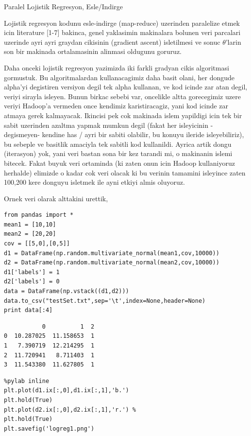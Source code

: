 \documentclass[12pt,fleqn]{article}\usepackage{../common}
\begin{document}
Paralel Lojistik Regresyon, Esle/Indirge

Lojistik regresyon kodunu esle-indirge (map-reduce) uzerinden paralelize
etmek icin literature [1-7] bakinca, genel yaklasimin makinalara bolunen
veri parcalari uzerinde ayri ayri graydan cikisinin (gradient ascent)
isletilmesi ve sonuc $\theta$'larin son bir makinada ortalamasinin alinmasi
oldugunu goruruz.

Daha onceki lojistik regresyon yazimizda iki farkli gradyan cikis
algoritmasi gormustuk. Bu algoritmalardan kullanacagimiz daha basit olani,
her dongude alpha'yi degistiren versiyon degil tek alpha kullanan, ve kod
icinde zar atan degil, veriyi sirayla isleyen. Bunun birkac sebebi var,
oncelikle altta gorecegimiz uzere veriyi Hadoop'a vermeden once kendimiz
karistiracagiz, yani kod icinde zar atmaya gerek kalmayacak. Ikincisi pek
cok makinada islem yapildigi icin tek bir sabit uzerinden azaltma yapmak
mumkun degil (fakat her isleyicinin -degismeyen- kendine has / ayri bir
sabiti olabilir, bu konuyu ileride isleyebiliriz), bu sebeple ve basitlik
amaciyla tek sabitli kod kullanildi. Ayrica artik dongu (iterasyon) yok,
yani veri bastan sona bir kez tarandi mi, o makinanin islemi bitecek. Fakat
buyuk veri ortaminda (ki zaten onun icin Hadoop kullaniyoruz herhalde)
elimizde o kadar cok veri olacak ki bu verinin tamamini isleyince zaten
100,200 kere donguyu isletmek ile ayni etkiyi almis oluyoruz.

Ornek veri olarak alttakini urettik,

\begin{verbatim}
from pandas import *
mean1 = [10,10]
mean2 = [20,20]
cov = [[5,0],[0,5]]             
d1 = DataFrame(np.random.multivariate_normal(mean1,cov,10000))
d2 = DataFrame(np.random.multivariate_normal(mean2,cov,10000))
d1['labels'] = 1
d2['labels'] = 0
data = DataFrame(np.vstack((d1,d2)))
data.to_csv("testSet.txt",sep='\t',index=None,header=None)
print data[:4]
\end{verbatim}

\begin{verbatim}
           0          1  2
0  10.287025  11.158653  1
1   7.390719  12.214295  1
2  11.720941   8.711403  1
3  11.543380  11.627805  1
\end{verbatim}

\begin{verbatim}
%pylab inline
plt.plot(d1.ix[:,0],d1.ix[:,1],'b.')
plt.hold(True)
plt.plot(d2.ix[:,0],d2.ix[:,1],'r.') %
plt.hold(True)
plt.savefig('logreg1.png')
\end{verbatim}
\end{document}
